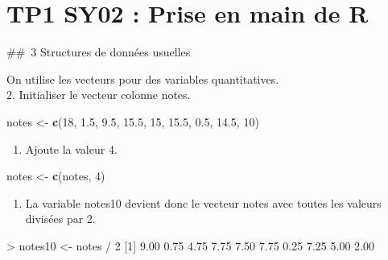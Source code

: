 \documentclass[
]{article}
\author{}
\date{}
\newenvironment{Shaded}{}{}
\newcommand{\DecValTok}[1]{\textcolor[rgb]{0.25,0.63,0.44}{#1}}
\newcommand{\FloatTok}[1]{\textcolor[rgb]{0.25,0.63,0.44}{#1}}
\newcommand{\KeywordTok}[1]{\textcolor[rgb]{0.00,0.44,0.13}{\textbf{#1}}}
\newcommand{\NormalTok}[1]{#1}
\newcommand{\OperatorTok}[1]{\textcolor[rgb]{0.40,0.40,0.40}{#1}}
\newcommand{\StringTok}[1]{\textcolor[rgb]{0.25,0.44,0.63}{#1}}
\providecommand{\tightlist}{%
  \setlength{\itemsep}{0pt}\setlength{\parskip}{0pt}}
\begin{document}
\hypertarget{tp1-sy02-prise-en-main-de-r}{%
\section{TP1 SY02 : Prise en main de
R}\label{tp1-sy02-prise-en-main-de-r}}

\#\#~3 Structures de données usuelles

On utilise les vecteurs pour des variables quantitatives.\\
2. Initialiser le vecteur colonne notes.

\begin{Shaded}
\begin{Highlighting}[]
\NormalTok{notes \textless{}{-}}\StringTok{ }\KeywordTok{c}\NormalTok{(}\DecValTok{18}\NormalTok{, }\FloatTok{1.5}\NormalTok{, }\FloatTok{9.5}\NormalTok{, }\FloatTok{15.5}\NormalTok{, }\DecValTok{15}\NormalTok{, }\FloatTok{15.5}\NormalTok{, }\FloatTok{0.5}\NormalTok{, }\FloatTok{14.5}\NormalTok{, }\DecValTok{10}\NormalTok{)}
\end{Highlighting}
\end{Shaded}

\begin{enumerate}
\def\labelenumi{\arabic{enumi}.}
\setcounter{enumi}{2}
\tightlist
\item
  Ajoute la valeur 4.\\
\end{enumerate}

\begin{Shaded}
\begin{Highlighting}[]
\NormalTok{notes \textless{}{-}}\StringTok{ }\KeywordTok{c}\NormalTok{(notes, }\DecValTok{4}\NormalTok{)}
\end{Highlighting}
\end{Shaded}

\begin{enumerate}
\def\labelenumi{\arabic{enumi}.}
\setcounter{enumi}{3}
\tightlist
\item
  La variable notes10 devient donc le vecteur notes avec toutes les
  valeurs divisées par 2.\\
\end{enumerate}

\begin{Shaded}
\begin{Highlighting}[]
 \OperatorTok{\textgreater{}}\StringTok{ }\NormalTok{notes10 \textless{}{-}}\StringTok{ }\NormalTok{notes }\OperatorTok{/}\StringTok{ }\DecValTok{2}
\NormalTok{[}\DecValTok{1}\NormalTok{] }\FloatTok{9.00} \FloatTok{0.75} \FloatTok{4.75} \FloatTok{7.75} \FloatTok{7.50} \FloatTok{7.75} \FloatTok{0.25} \FloatTok{7.25} \FloatTok{5.00} \FloatTok{2.00}  
\end{Highlighting}
\end{Shaded}
\end{document}
